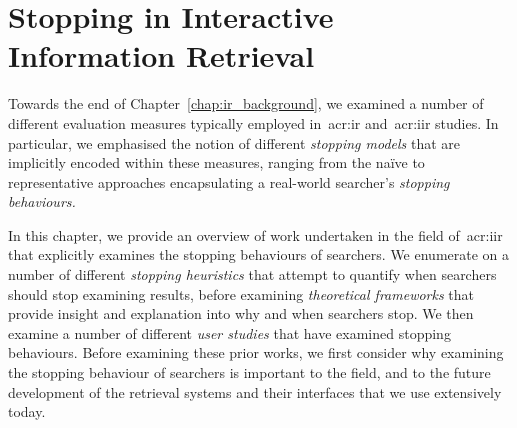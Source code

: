 
\chapter[A Background of Stopping in IIR]{Stopping in Interactive\\Information Retrieval}\label{chap:stopping_background}
Towards the end of Chapter~\ref{chap:ir_background}, we examined a number of different evaluation measures typically employed in~\gls{acr:ir} and~\gls{acr:iir} studies. In particular, we emphasised the notion of different \emph{stopping models} that are implicitly encoded within these measures, ranging from the na\"{i}ve to representative approaches encapsulating a real-world searcher's \emph{stopping behaviours.}

\begin{figure}[h]
    \centering
    \vspace{4mm}
    \label{fig:stopsign}
    \vspace{-5mm}
\end{figure}

In this chapter, we provide an overview of work undertaken in the field of~\gls{acr:iir} that explicitly examines the stopping behaviours of searchers. We enumerate on a number of different \emph{stopping heuristics} that attempt to quantify when searchers should stop examining results, before examining \emph{theoretical frameworks} that provide insight and explanation into why and when searchers stop. We then examine a number of different \emph{user studies} that have examined stopping behaviours. Before examining these prior works, we first consider why examining the stopping behaviour of searchers is important to the field, and to the future development of the retrieval systems and their interfaces that we use extensively today.

